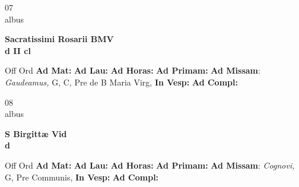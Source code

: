 \documentclass[10pt, openany]{book}
\begin{document}
    \begin{center}
        \begin{minipage}{3.5in}
            \vspace{2em}
            \begin{minipage}{0.5in}
                {\Huge 07} \\
                {\normalsize albus}
            \end{minipage}
            \begin{minipage}{3.0in}
                \textbf{ \large Sacratissimi Rosarii BMV \\
                \textnormal{\normalsize d II cl}}

            \end{minipage}
            \begin{justify}Off Ord
                \textbf{Ad Mat: }
                \textbf{Ad Lau: }
                \textbf{Ad Horas: }
                \textbf{Ad Primam: }\textbf{Ad Missam}: \textit{Gaudeamus,} G, C, Pre de B Maria Virg, 
                \textbf{In Vesp: }
                \textbf{Ad Compl: }
            \end{justify}
        \end{minipage}
    \end{center}

    \begin{center}
        \begin{minipage}{3.5in}
            \vspace{2em}
            \begin{minipage}{0.5in}
                {\Huge 08} \\
                {\normalsize albus}
            \end{minipage}
            \begin{minipage}{3.0in}
                \textbf{ \large S Birgittæ Vid \\
                \textnormal{\normalsize d}}

            \end{minipage}
            \begin{justify}Off Ord
                \textbf{Ad Mat: }
                \textbf{Ad Lau: }
                \textbf{Ad Horas: }
                \textbf{Ad Primam: }\textbf{Ad Missam}: \textit{Cognovi,} G, Pre Communis, 
                \textbf{In Vesp: }
                \textbf{Ad Compl: }
            \end{justify}
        \end{minipage}
    \end{center}
\end{document}
